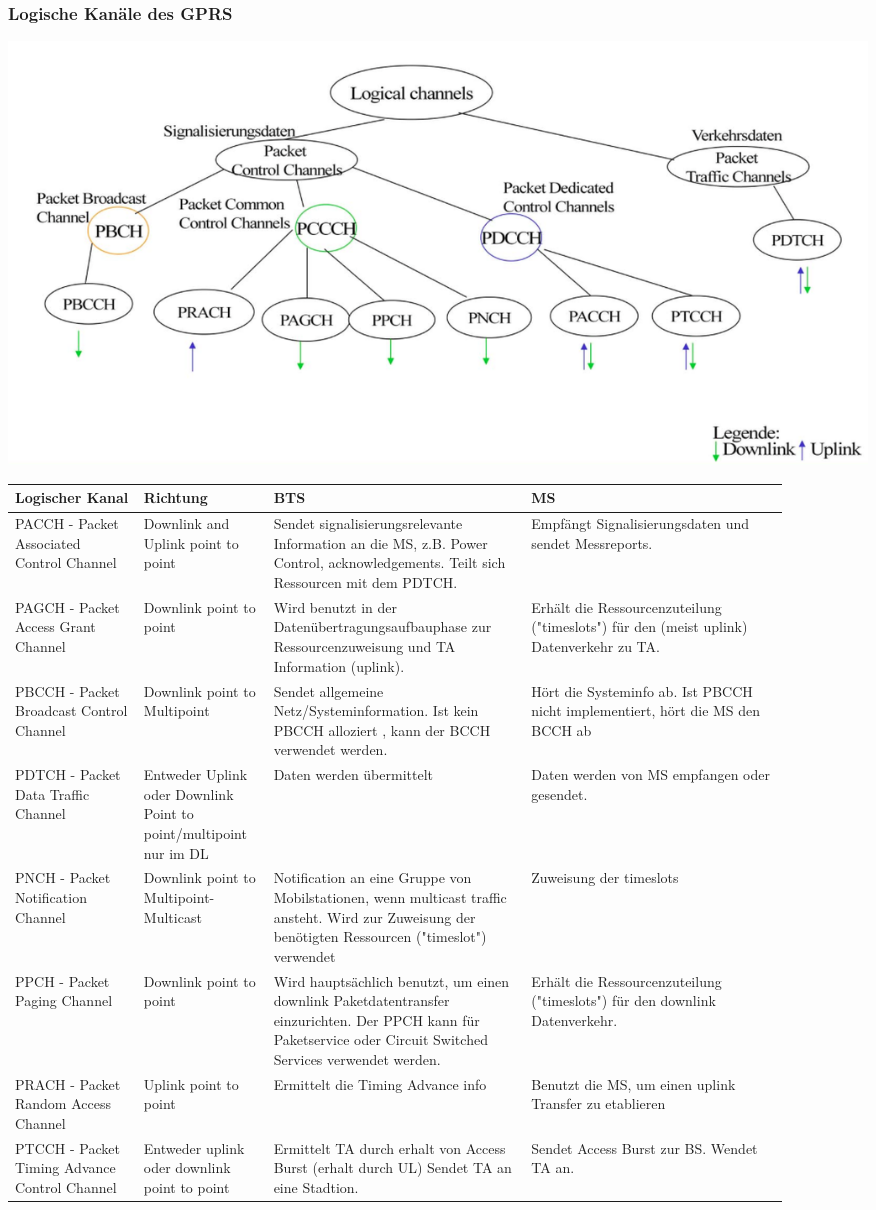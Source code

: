 \subsubsection{Logische Kanäle des GPRS}
\includegraphics[width = 0.6 \linewidth]{./Pics/GPRSKanaele}

\begin{tabular}{p{0.15 \linewidth} p{0.15 \linewidth} p{0.3 \linewidth} p{0.3 \linewidth}}
\toprule
Logischer Kanal & Richtung & BTS & MS \\
\midrule
PACCH - Packet Associated Control Channel & Downlink and Uplink point to point & Sendet signalisierungsrelevante Information an die MS, z.B. Power Control, acknowledgements. Teilt sich Ressourcen mit dem PDTCH. & Empfängt Signalisierungsdaten und sendet Messreports.\\
\midrule
PAGCH - Packet Access Grant Channel & Downlink point to point & Wird benutzt in der Datenübertragungsaufbauphase zur Ressourcenzuweisung und TA Information (uplink). & Erhält die Ressourcenzuteilung ("timeslots") für den (meist uplink) Datenverkehr zu TA. \\
\midrule
PBCCH - Packet Broadcast Control Channel & Downlink point to Multipoint & Sendet allgemeine Netz/Systeminformation. Ist kein PBCCH alloziert , kann der BCCH verwendet werden. & Hört die Systeminfo ab. Ist PBCCH nicht implementiert, hört die MS den BCCH ab \\
\midrule
PDTCH - Packet Data Traffic Channel & Entweder Uplink oder Downlink Point to point/multipoint nur im DL & Daten werden übermittelt & Daten werden von MS empfangen oder gesendet. \\
\midrule
PNCH - Packet Notification Channel & Downlink point to Multipoint-Multicast & Notification an eine Gruppe von Mobilstationen, wenn multicast traffic ansteht. Wird zur Zuweisung der benötigten Ressourcen ("timeslot") verwendet & Zuweisung der timeslots\\
\midrule
PPCH - Packet Paging Channel & Downlink point to point & Wird hauptsächlich benutzt, um einen downlink Paketdatentransfer einzurichten. Der PPCH kann für Paketservice oder Circuit Switched Services verwendet werden. & Erhält die Ressourcenzuteilung ("timeslots") für den downlink Datenverkehr. \\
\midrule
PRACH - Packet Random Access Channel & Uplink point to point & Ermittelt die Timing Advance info & Benutzt die MS, um einen uplink Transfer zu etablieren \\
\midrule
PTCCH - Packet Timing Advance Control Channel & Entweder uplink oder downlink point to point & Ermittelt TA durch erhalt von Access Burst (erhalt durch UL) Sendet TA an eine Stadtion. & Sendet Access Burst zur BS. Wendet TA an. \\
\bottomrule
\end{tabular}

